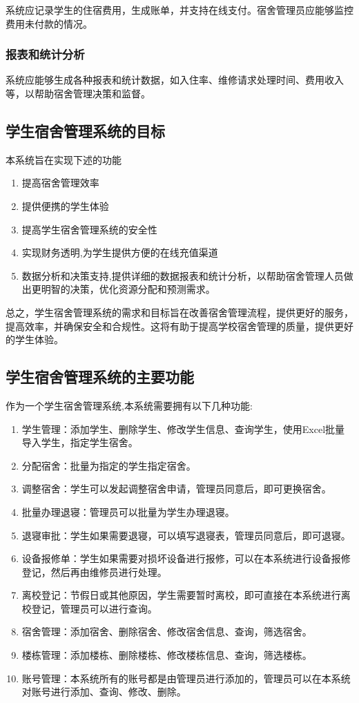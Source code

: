 \documentclass[UTF-8]{ctexart}
\begin{document}
系统应记录学生的住宿费用，生成账单，并支持在线支付。宿舍管理员应能够监控费用未付款的情况。

\subsubsection{报表和统计分析}

系统应能够生成各种报表和统计数据，如入住率、维修请求处理时间、费用收入等，以帮助宿舍管理决策和监督。

\subsection{学生宿舍管理系统的目标}
本系统旨在实现下述的功能

\begin{enumerate}
    \item 提高宿舍管理效率
    \item 提供便携的学生体验
    \item 提高学生宿舍管理系统的安全性
    \item 实现财务透明,为学生提供方便的在线充值渠道
    \item 数据分析和决策支持,提供详细的数据报表和统计分析，以帮助宿舍管理人员做出更明智的决策，优化资源分配和预测需求。

\end{enumerate}

总之，学生宿舍管理系统的需求和目标旨在改善宿舍管理流程，提供更好的服务，提高效率，并确保安全和合规性。这将有助于提高学校宿舍管理的质量，提供更好的学生体验。

\subsection{学生宿舍管理系统的主要功能}
作为一个学生宿舍管理系统,本系统需要拥有以下几种功能:
\begin{enumerate}
    \item 学生管理：添加学生、删除学生、修改学生信息、查询学生，使用Excel批量导入学生，指定学生宿舍。
    \item 分配宿舍：批量为指定的学生指定宿舍。
    \item 调整宿舍：学生可以发起调整宿舍申请，管理员同意后，即可更换宿舍。
    \item 批量办理退寝：管理员可以批量为学生办理退寝。
    \item 退寝审批：学生如果需要退寝，可以填写退寝表，管理员同意后，即可退寝。
    \item 设备报修单：学生如果需要对损坏设备进行报修，可以在本系统进行设备报修登记，然后再由维修员进行处理。
    \item 离校登记：节假日或其他原因，学生需要暂时离校，即可直接在本系统进行离校登记，管理员可以进行查询。
    \item 宿舍管理：添加宿舍、删除宿舍、修改宿舍信息、查询，筛选宿舍。
    \item 楼栋管理：添加楼栋、删除楼栋、修改楼栋信息、查询，筛选楼栋。
    \item 账号管理：本系统所有的账号都是由管理员进行添加的，管理员可以在本系统对账号进行添加、查询、修改、删除。

\end{enumerate}
\end{document}
